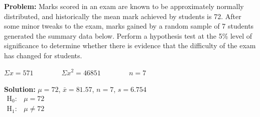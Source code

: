 \documentclass[
  11pt,
]{book}
\begin{document}
\begin{tcolorbox}[title=Example,colback=RoyalBlue!1!,colframe=RoyalBlue]
\textbf{Problem:} Marks scored in an exam are known to be approximately normally distributed, and historically the mean mark achieved by students is 72. After some minor tweaks to the exam, marks gained by a random sample of 7 students generated the summary data below. Perform a hypothesis test at the 5\% level of significance to determine whether there is evidence that the difficulty of the exam has changed for students.\\

\vspace{-0.8cm}

\begin{center}
$\Sigma x=\text{571} \qquad \qquad \Sigma x^\text{2}=\text{46851} \qquad \qquad n=\text{7}$
\end{center}

\tcblower
\textbf{Solution:}
$\mu=\text{72}$, $\bar{x}=\text{81.57}$, $n=\text{7}$, $s=\text{6.754}$\\

\begin{math}
\begin{array}{ll}
      \text{H}_\text{0}: & \mu=\text{72}\\
      \text{H}_\text{1}: & \mu\ne \text{72}
    \end{array}
\end{math}

\vspace{0.5cm}


\end{tcolorbox}
\end{document}
